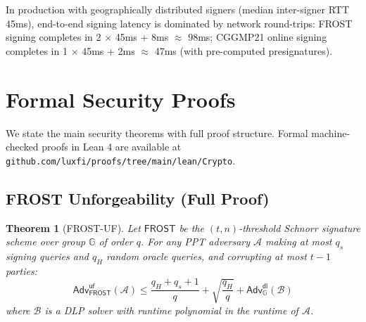 \documentclass[11pt,twocolumn]{article}
\newtheorem{theorem}{Theorem}[section]
\begin{document}
In production with geographically distributed signers (median inter-signer RTT 45ms),
end-to-end signing latency is dominated by network round-trips: FROST signing
completes in 2 $\times$ 45ms + 8ms $\approx$ 98ms; CGGMP21 online signing completes
in 1 $\times$ 45ms + 2ms $\approx$ 47ms (with pre-computed presignatures).

\section{Formal Security Proofs}
\label{sec:proofs}

We state the main security theorems with full proof structure. Formal machine-checked
proofs in Lean 4 are available at
\texttt{github.com/luxfi/proofs/tree/main/lean/Crypto}.

\subsection{FROST Unforgeability (Full Proof)}

\begin{theorem}[FROST-UF]
\label{thm:frost-uf-full}
Let $\mathsf{FROST}$ be the $(t,n)$-threshold Schnorr signature scheme over group
$\mathbb{G}$ of order $q$. For any PPT adversary $\mathcal{A}$ making at most $q_s$
signing queries and $q_H$ random oracle queries, and corrupting at most $t-1$ parties:
\[
  \mathsf{Adv}^{\mathsf{uf}}_{\mathsf{FROST}}(\mathcal{A}) \leq
    \frac{q_H + q_s + 1}{q} + \sqrt{\frac{q_H}{q}} +
    \mathsf{Adv}^{\mathsf{dl}}_{\mathbb{G}}(\mathcal{B})
\]
where $\mathcal{B}$ is a DLP solver with runtime polynomial in the runtime of
$\mathcal{A}$.
\end{theorem}
\end{document}
